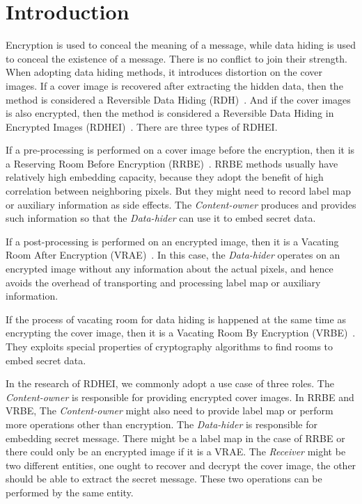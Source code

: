 \documentclass{elsarticle}
\begin{document}
	\section{Introduction}
	\label{sec:intro}
	
	Encryption is used to conceal the meaning of a message, while data hiding is used to conceal the existence of a message.
	There is no conflict to join their strength.
	When adopting data hiding methods, it introduces distortion on the cover images. 
	If a cover image is recovered after extracting the hidden data, then the method is considered a Reversible Data Hiding (RDH)~\cite{Coatrieux2009, Gao2009, Li2020}.
	And if the cover images is also encrypted, then the method is considered a Reversible Data Hiding in Encrypted Images (RDHEI)~\cite{Zhang2011, Liu2020, Jain2021, Di2018}.
	There are three types of RDHEI.
	
	If a pre-processing is performed on a cover image before the encryption, then it is a Reserving Room Before Encryption (RRBE)~\cite{Ma2013, Agrawal2017, Liao2015}.
	RRBE methods usually have relatively high embedding capacity, because they adopt the benefit of high correlation between neighboring pixels. 
	But they might need to record label map or auxiliary information as side effects. 
	The \emph{Content-owner} produces and provides such information so that the \emph{Data-hider} can use it to embed secret data.
	
	If a post-processing is performed on an encrypted image, then it is a Vacating Room After Encryption (VRAE)~\cite{Puech2008, Wu2019, Li2018}. 
	In this case, the \emph{Data-hider} operates on an encrypted image without any information about the actual pixels, and hence avoids the overhead of transporting and processing label map or auxiliary information.
	
	If the process of vacating room for data hiding is happened at the same time as encrypting the cover image, then it is a Vacating Room By Encryption (VRBE)~\cite{Liu2018, Yu2020}. 
	They exploits special properties of cryptography algorithms to find rooms to embed secret data.
	
	In the research of RDHEI, we commonly adopt a use case of three roles. 
	The \emph{Content-owner} is responsible for providing encrypted cover images. 
	In RRBE and VRBE, The \emph{Content-owner} might also need to provide label map or perform more operations other than encryption.
	The \emph{Data-hider} is responsible for embedding secret message. 
	There might be a label map in the case of RRBE or there could only be an encrypted image if it is a VRAE.
	The \emph{Receiver} might be two different entities, one ought to recover and decrypt the cover image, the other should be able to extract the secret message. 
	These two operations can be performed by the same entity.
	
\end{document}
